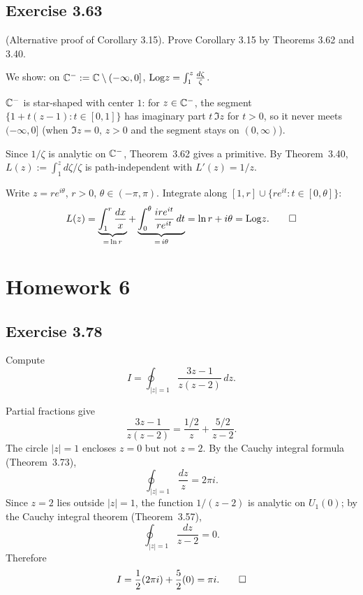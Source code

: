 \documentclass{article}
\begin{document}
\subsection{Exercise 3.63}

(Alternative proof of Corollary 3.15).
Prove Corollary 3.15 by Theorems 3.62 and 3.40.

\begin{solution}
	We show: on $\mathbb{C}^-:=\mathbb{C}\setminus(-\infty,0]$,
	$\mathrm{Log} z=\int_1^z\frac{d\zeta}{\zeta}$.

	\smallskip

	$\mathbb{C}^-$ is star-shaped with center $1$:
	for $z\in\mathbb{C}^-$, the segment
	$\{1+t(z-1):t\in[0,1]\}$ has imaginary part
	$t\,\Im z$ for $t>0$, so it never meets $(-\infty,0]$
	(when $\Im z=0$, $z>0$ and the segment stays on
	$(0,\infty)$).

	Since $1/\zeta$ is analytic on $\mathbb{C}^-$,
	Theorem~3.62 gives a primitive.
	By Theorem~3.40,
	$L(z):=\int_1^z d\zeta/\zeta$ is path-independent
	with $L'(z)=1/z$.

	Write $z=re^{i\theta}$, $r>0$, $\theta\in(-\pi,\pi)$.
	Integrate along $[1,r]\cup\{re^{it}:t\in[0,\theta]\}$:
	\[
		L(z)
		=\underbrace{\int_1^r\frac{dx}{x}}_{=\,\ln r}
		+\underbrace{\int_0^\theta
		\frac{ire^{it}}{re^{it}}\,dt}_{=\,i\theta}
		=\ln r+i\theta
		=\mathrm{Log} z.\qedhere
	\]
\end{solution}

\section{Homework 6}

\subsection{Exercise 3.78}

Compute
\[
  I = \oint_{|z|=1} \frac{3z-1}{z(z-2)}\,dz.
\]

\begin{solution}
  Partial fractions give
  \[
    \frac{3z-1}{z(z-2)}
    = \frac{1/2}{z} + \frac{5/2}{z-2}.
  \]
  The circle $|z|=1$ encloses $z=0$ but not $z=2$.
  By the Cauchy integral formula (Theorem~3.73),
  \[
    \oint_{|z|=1}\frac{dz}{z} = 2\pi i.
  \]
  Since $z=2$ lies outside $|z|=1$, the function
  $1/(z-2)$ is analytic on $U_1(0)$; by the Cauchy
  integral theorem (Theorem~3.57),
  \[
    \oint_{|z|=1}\frac{dz}{z-2} = 0.
  \]
  Therefore
  \[
    I = \frac{1}{2}(2\pi i) + \frac{5}{2}(0) = \pi i.\qedhere
  \]
\end{solution}
\end{document}

